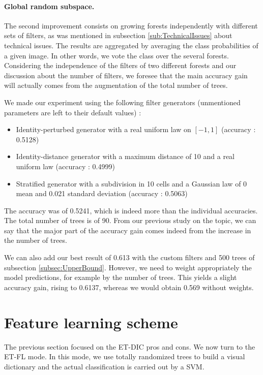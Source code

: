 \documentclass[a4paper]{report}
\begin{document}
	
	
	\paragraph{Global random subspace.}
	The second improvement consists on growing forests independently with different sets of filters, as was mentioned in subsection \ref{sub:TechnicalIssues} about technical issues. The results are aggregated by averaging the class probabilities of a given image. In other words, we vote the class over the several forests.
	Considering the independence of the filters of two different forests and our discussion about the number of filters, we foresee that the main accuracy gain will actually comes from the augmentation of the total number of trees. 
	\par
	We made our experiment using the following filter generators (unmentioned parameters are left to their default values) : 
	\begin{itemize}
		\item Identity-perturbed generator with a real uniform law on $[-1, 1]$ (accuracy : 0.5128)	 %
		\item Identity-distance generator with a maximum distance of 10 and a real uniform law (accuracy : 0.4999) %
		\item Stratified generator with a subdivision in 10 cells and a Gaussian law of 0 mean and 0.021 standard deviation (accuracy : 0.5063) %
	\end{itemize}
	The accuracy was of 0.5241, which is indeed more than the individual accuracies. The total number of trees is of 90. From our previous study on the topic, we can say that the major part of the accuracy gain comes indeed from the increase in the number of trees.
	\par
	We can also add our best result of 0.613 with the custom filters and 500 trees of subsection \ref{subsec:UpperBound}. However, we need to weight appropriately the model predictions, for example by the number of trees. This yields a slight accuracy gain, rising to 0.6137, whereas we would obtain 0.569 without weights. 
	
	
	
	
	
	

	
	\section{Feature learning scheme}
	The previous section focused on the ET-DIC pros and cons. We now turn to the ET-FL mode. In this mode, we use totally randomized trees to build a visual dictionary and the actual classification is carried out by a SVM. 
\end{document}
